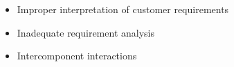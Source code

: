 \label{sec:risks}
\begin{itemize}
	
\item Improper interpretation of customer requirements 
\item Inadequate requirement analysis 
\item Intercomponent interactions 
\end{itemize}